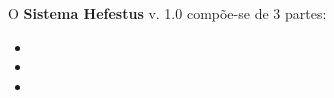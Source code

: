 \large
\begin{multicols}{2}
	O \textbf{Sistema Hefestus} v. 1.0 compõe-se de 3 partes: 

\begin{itemize}
	\item 
	\item
	\item
\end{itemize}
\end{multicols}

\vfill\null
\pagebreak